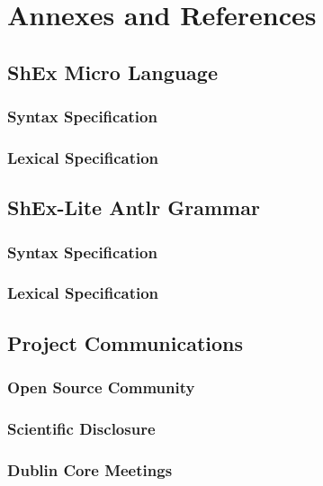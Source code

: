 \documentclass[open=any]{SPhdThesis}
\begin{document}
	\part{Annexes and References}
	\begin{appendices}
		\chapter{ShEx Micro Language}
		\section{Syntax Specification}
		\section{Lexical Specification}
		\chapter{ShEx-Lite Antlr Grammar}
		\section{Syntax Specification}
		\section{Lexical Specification}
		\chapter{Project Communications}
		\section{Open Source Community}
		\section{Scientific Disclosure}
		\section{Dublin Core Meetings}
	\end{appendices}

\end{document}
